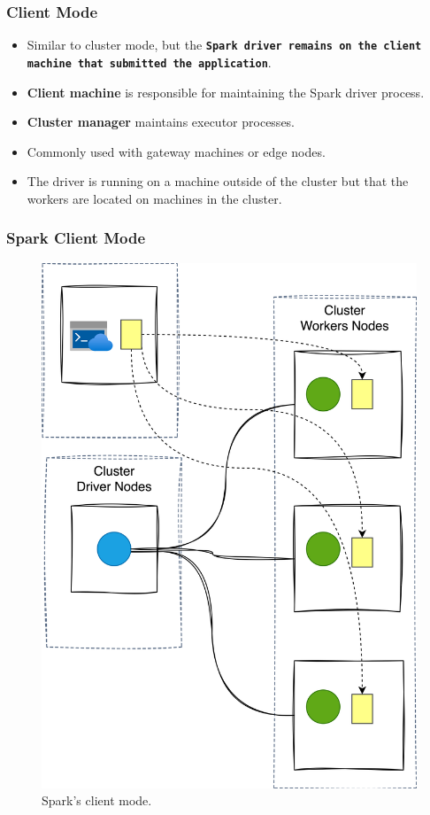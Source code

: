 \begin{frame}
    \frametitle{Client Mode}
    \begin{itemize}
        \item Similar to cluster mode, but the  \textbf{\texttt{Spark driver remains on the client
        machine that submitted the application}}.
        \item \textbf{Client machine} is responsible for maintaining the Spark driver process.
        \item \textbf{Cluster manager} maintains executor processes.
        \item Commonly used with gateway machines or edge nodes.
        \item The driver is running on a machine outside of the cluster but that the workers are located on machines in the cluster.
    \end{itemize}
\end{frame}

\begin{frame}
    \frametitle{Spark Client Mode}
    \begin{figure}
        \includegraphics[width=\textwidth,height=.7\textheight,keepaspectratio]{./Figures/chapter-04/spark_client_mode}
        \caption{Spark’s client mode.}\label{fig:client_mode}
    \end{figure}
\end{frame}

